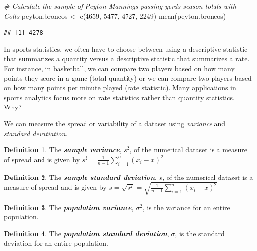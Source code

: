 \documentclass[
]{book}
\newenvironment{Shaded}{\begin{snugshade}}{\end{snugshade}}
\newcommand{\CommentTok}[1]{\textcolor[rgb]{0.56,0.35,0.01}{\textit{#1}}}
\newcommand{\DecValTok}[1]{\textcolor[rgb]{0.00,0.00,0.81}{#1}}
\newcommand{\FunctionTok}[1]{\textcolor[rgb]{0.00,0.00,0.00}{#1}}
\newcommand{\NormalTok}[1]{#1}
\newcommand{\OtherTok}[1]{\textcolor[rgb]{0.56,0.35,0.01}{#1}}
\theoremstyle{definition}
\newtheorem{definition}{Definition}[chapter]
\theoremstyle{definition}
\theoremstyle{definition}
\theoremstyle{definition}
\theoremstyle{remark}
\begin{document}
\hfill\break
\hfill\break
\hfill\break
\hfill\break
\hfill\break

\begin{Shaded}
\begin{Highlighting}[]
\CommentTok{\# Calculate the sample of Peyton Manning\textquotesingle{}s passing yards season totals with Colts}
\NormalTok{peyton.broncos }\OtherTok{\textless{}{-}} \FunctionTok{c}\NormalTok{(}\DecValTok{4659}\NormalTok{, }\DecValTok{5477}\NormalTok{, }\DecValTok{4727}\NormalTok{, }\DecValTok{2249}\NormalTok{)}
\FunctionTok{mean}\NormalTok{(peyton.broncos)}
\end{Highlighting}
\end{Shaded}

\begin{verbatim}
## [1] 4278
\end{verbatim}

In sports statistics, we often have to choose between using a descriptive statistic that summarizes a quantity versus a descriptive statistic that summarizes a rate. For instance, in basketball, we can compare two players based on how many points they score in a game (total quantity) or we can compare two players based on how many points per minute played (rate statistic). Many applications in sports analytics focus more on rate statistics rather than quantity statistics. Why?

We can measure the spread or variability of a dataset using \emph{variance} and \emph{standard devatiation}.

\begin{definition}
The \textbf{\emph{sample variance}}, \(s^2\), of the numerical dataset is a measure of spread and is given by \(s^2 = \frac{1}{n-1}\sum_{i=1}^n (x_i - \bar{x})^2\)
\end{definition}

\begin{definition}
The \textbf{\emph{sample standard deviation}}, \(s\), of the numerical dataset is a measure of spread and is given by \(s = \sqrt{s^2} = \sqrt{\frac{1}{n-1}\sum_{i=1}^n (x_i - \bar{x})^2}\)
\end{definition}

\begin{definition}
The \textbf{\emph{population variance}}, \(\sigma^2\), is the variance for an entire population.
\end{definition}

\begin{definition}
The \textbf{\emph{population standard deviation}}, \(\sigma\), is the standard deviation for an entire population.
\end{definition}
\end{document}
